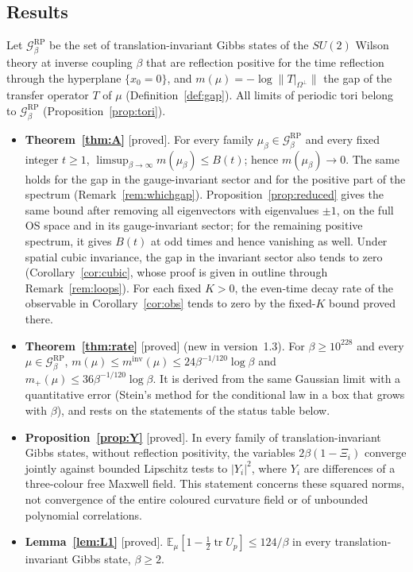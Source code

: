 \documentclass[11pt,a4paper]{article}
\theoremstyle{plain}
\theoremstyle{definition}
\theoremstyle{remark}
\numberwithin{equation}{section}
\newcommand{\E}{\mathbb{E}}
\newcommand{\tr}{\operatorname{tr}}
\newcommand{\st}[1]{\textsf{[#1]}}
\newcommand{\cG}{\mathcal{G}}
\begin{document}
\subsection{Results}
Let $\cG^{\mathrm{RP}}_\beta$ be the set of translation-invariant Gibbs states of the $SU(2)$ Wilson theory at inverse coupling $\beta$
that are reflection positive for the time reflection through the hyperplane $\{x_0=0\}$, and $m(\mu)=-\log\|T|_{\Omega^\perp}\|$ the gap of
the transfer operator $T$ of $\mu$ (Definition~\ref{def:gap}). All limits of periodic tori belong to $\cG^{\mathrm{RP}}_\beta$
(Proposition~\ref{prop:tori}).
\begin{itemize}
\item \textbf{Theorem~\ref{thm:A}} \st{proved}. For every family $\mu_\beta\in\cG^{\mathrm{RP}}_\beta$ and every fixed integer $t\ge1$,
$\limsup_{\beta\to\infty}m(\mu_\beta)\le B(t)$; hence $m(\mu_\beta)\to0$. The same holds for the gap in the gauge-invariant sector and
for the positive part of the spectrum (Remark~\ref{rem:whichgap}). Proposition~\ref{prop:reduced} gives the same bound after removing
all eigenvectors with eigenvalues $\pm1$, on the full OS space and in its gauge-invariant sector; for the remaining positive spectrum,
it gives $B(t)$ at odd times and hence vanishing as well. Under spatial cubic invariance, the gap in the invariant sector
also tends to zero (Corollary~\ref{cor:cubic}, whose proof is given in outline through Remark~\ref{rem:loops}). For each fixed $K>0$, the even-time decay rate of the observable in
Corollary~\ref{cor:obs} tends to zero by the fixed-$K$ bound proved there.
\item \textbf{Theorem~\ref{thm:rate}} \st{proved} (new in version~1.3). For $\beta\ge10^{228}$ and every $\mu\in\cG^{\mathrm{RP}}_\beta$,
$m(\mu)\le m^{\mathrm{inv}}(\mu)\le24\beta^{-1/120}\log\beta$ and $m_+(\mu)\le36\beta^{-1/120}\log\beta$. It is derived from the same
Gaussian limit with a quantitative error (Stein's method for the conditional law in a box that grows with $\beta$), and rests on the statements
of the status table below.
\item \textbf{Proposition~\ref{prop:Y}} \st{proved}. In every family of translation-invariant Gibbs states, without reflection positivity,
the variables $2\beta(1-\Xi_i)$ converge jointly against bounded Lipschitz tests to $|Y_i|^2$, where $Y_i$ are differences of a
three-colour free Maxwell field. This statement concerns these squared norms, not convergence of the entire coloured curvature field
or of unbounded polynomial correlations.
\item \textbf{Lemma~\ref{lem:L1}} \st{proved}. $\E_\mu[1-\frac12\tr U_p]\le124/\beta$ in every translation-invariant Gibbs state, $\beta\ge2$.
\end{itemize}
\end{document}
